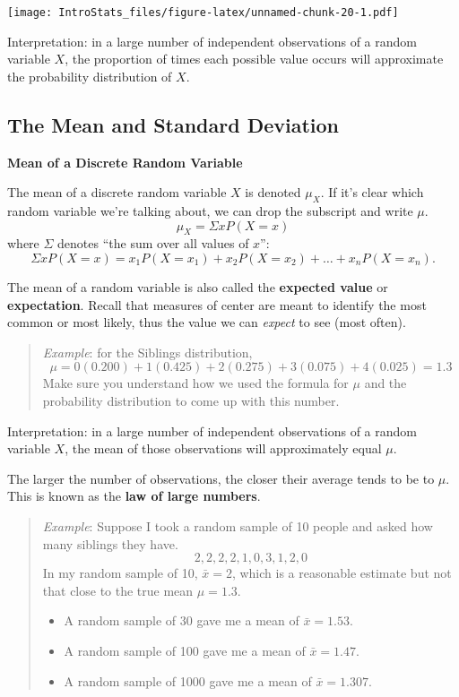 \documentclass[
]{book}
\providecommand{\tightlist}{%
  \setlength{\itemsep}{0pt}\setlength{\parskip}{0pt}}
\begin{document}
\texttt{[image: IntroStats\_files/figure-latex/unnamed-chunk-20-1.pdf]}

Interpretation: in a large number of independent observations of a random variable \(X\), the proportion of times each possible value occurs will approximate the probability distribution of \(X\).

\hypertarget{the-mean-and-standard-deviation}{%
\subsection{The Mean and Standard Deviation}\label{the-mean-and-standard-deviation}}

\textbf{Mean of a Discrete Random Variable}

The mean of a discrete random variable \(X\) is denoted \(\mu_X\). If it's clear which random variable we're talking about, we can drop the subscript and write \(\mu\).
\[
  \mu_X = \Sigma xP(X=x)
\]
where \(\Sigma\) denotes ``the sum over all values of \(x\)'': \[\Sigma xP(X=x) = x_1P(X=x_1) + x_2P(X=x_2) + \dots + x_nP(X=x_n).\]

The mean of a random variable is also called the \textbf{expected value} or \textbf{expectation}. Recall that measures of center are meant to identify the most common or most likely, thus the value we can \emph{expect} to see (most often).

\begin{quote}
\emph{Example}: for the Siblings distribution, \[\mu = 0(0.200)+1(0.425)+2(0.275)+3(0.075)+4(0.025)=1.3\]
Make sure you understand how we used the formula for \(\mu\) and the probability distribution to come up with this number.
\end{quote}

Interpretation: in a large number of independent observations of a random variable \(X\), the mean of those observations will approximately equal \(\mu\).

The larger the number of observations, the closer their average tends to be to \(\mu\). This is known as the \textbf{law of large numbers}.

\begin{quote}
\emph{Example}: Suppose I took a random sample of 10 people and asked how many siblings they have. \[2,2,2,2,1,0,3,1,2,0\] In my random sample of 10, \(\bar{x}=2\), which is a reasonable estimate but not that close to the true mean \(\mu=1.3\).

\begin{itemize}
\tightlist
\item
  A random sample of 30 gave me a mean of \(\bar{x}=1.53\).
\item
  A random sample of 100 gave me a mean of \(\bar{x}=1.47\).
\item
  A random sample of 1000 gave me a mean of \(\bar{x}=1.307\).
\end{itemize}
\end{quote}
\end{document}
